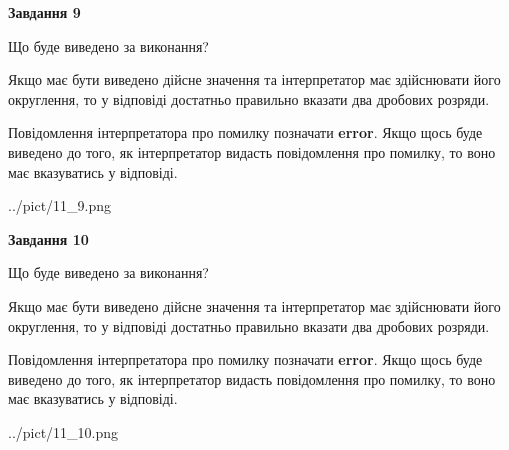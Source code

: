 \documentclass[12pt, ukrainian]{article}
\begin{document}
{\begin {Large}
{\begin {center}\textbf{Завдання 9}\end {center}}\par
Що буде виведено за виконання? \par

Якщо має бути виведено дійсне значення та інтерпретатор має здійснювати його округлення, 
то у відповіді достатньо правильно вказати два дробових розряди.

Повідомлення інтерпретатора про помилку позначати \textbf{error}.
Якщо щось буде виведено до того, як інтерпретатор видасть повідомлення про помилку, 
то воно має вказуватись у відповіді. \par

\begin{center}
	{../pict/11_9.png}
\end{center}
\newpage

{\begin {center}\textbf{Завдання 10}\end {center}}\par
Що буде виведено за виконання? \par

Якщо має бути виведено дійсне значення та інтерпретатор має здійснювати його округлення, 
то у відповіді достатньо правильно вказати два дробових розряди.

Повідомлення інтерпретатора про помилку позначати \textbf{error}.
Якщо щось буде виведено до того, як інтерпретатор видасть повідомлення про помилку, 
то воно має вказуватись у відповіді. \par

\begin{center}
	{../pict/11_10.png}
\end{center}
\newpage

\end {Large}}
\end{document}
